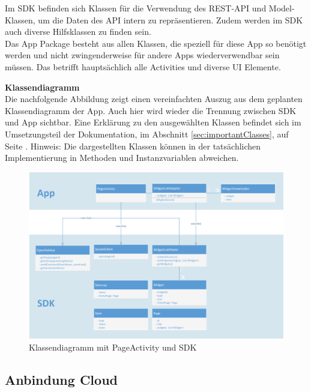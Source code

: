 Im SDK befinden sich Klassen für die Verwendung des REST-API und Model-Klassen, um die Daten des API intern zu repräsentieren. Zudem werden im SDK auch diverse Hilfsklassen zu finden sein. \\
Das App Package besteht aus allen Klassen, die speziell für diese App so benötigt werden und nicht zwingenderweise für andere Apps wiederverwendbar sein müssen. Das betrifft hauptsächlich alle Activities und diverse UI Elemente.

\textbf{Klassendiagramm}\\
Die nachfolgende Abbildung zeigt einen vereinfachten Auszug aus dem geplanten Klassendiagramm der App. Auch hier wird wieder die Trennung zwischen SDK und App sichtbar. Eine Erklärung zu den ausgewählten Klassen befindet sich im Umsetzungsteil der Dokumentation, im Abschnitt \ref{sec:importantClasses}, auf Seite \pageref{sec:importantClasses}. Hinweis: Die dargestellten Klassen können in der tatsächlichen Implementierung in Methoden und Instanzvariablen abweichen.
\begin{figure}[H]
	\centering
		\includegraphics[width=\textwidth]{report/img/android_uml.png}
	\caption{Klassendiagramm mit PageActivity und SDK}
	\label{fig:androidUML}
\end{figure}


\subsection{Anbindung Cloud}

